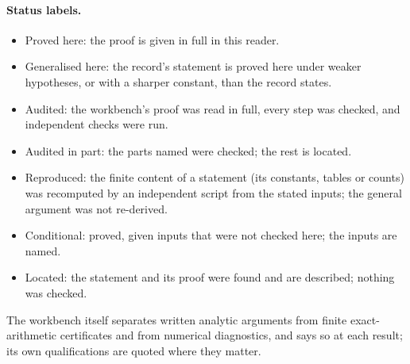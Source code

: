 \paragraph{Status labels.}
\begin{itemize}
\item \textsf{Proved here}: the proof is given in full in this reader.
\item \textsf{Generalised here}: the record's statement is proved here under weaker hypotheses, or with a sharper constant, than the record states.
\item \textsf{Audited}: the workbench's proof was read in full, every step was checked, and independent checks were run.
\item \textsf{Audited in part}: the parts named were checked; the rest is located.
\item \textsf{Reproduced}: the finite content of a statement (its constants, tables or counts) was recomputed by an independent script from the stated inputs; the general argument was not re-derived.
\item \textsf{Conditional}: proved, given inputs that were not checked here; the inputs are named.
\item \textsf{Located}: the statement and its proof were found and are described; nothing was checked.
\end{itemize}
The workbench itself separates written analytic arguments from finite exact-arithmetic certificates and from numerical diagnostics, and says so at each result; its own qualifications are quoted where they matter.
